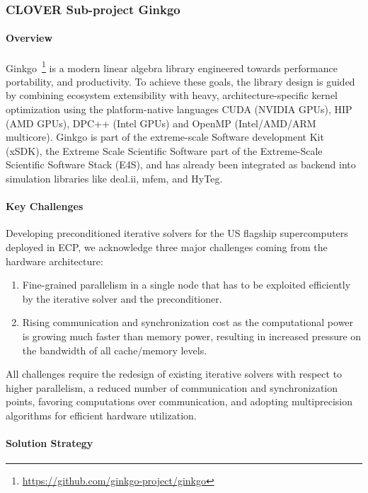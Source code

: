 \subsubsection{ CLOVER Sub-project Ginkgo} \label{subsubsect:peeks}
\paragraph{Overview} 
Ginkgo~\footnote{\url{https://github.com/ginkgo-project/ginkgo}} 
is a modern linear algebra library engineered towards performance portability, and productivity. 
To achieve these goals, the library design is guided by combining ecosystem extensibility with heavy, 
architecture-specific kernel optimization using the platform-native languages CUDA (NVIDIA GPUs), 
HIP (AMD GPUs), DPC++ (Intel GPUs) and OpenMP (Intel/AMD/ARM multicore). 
Ginkgo is part of the extreme-scale Software development Kit (xSDK), 
the Extreme Scale Scientific Software part of the Extreme-Scale Scientific Software Stack (E4S), 
and has already been integrated as backend into simulation libraries like deal.ii, mfem, and HyTeg. 



\paragraph{Key  Challenges}
Developing preconditioned iterative solvers for the US flagship supercomputers 
deployed in ECP, we acknowledge three major challenges coming from the hardware 
architecture:
\begin{enumerate}
\item 
Fine-grained parallelism in a single node that has to be exploited efficiently 
by the iterative solver and the preconditioner.
\item
Rising communication and synchronization cost as the
computational power is growing much faster than memory power, resulting in 
increased pressure on the bandwidth of all cache/memory levels.
\end{enumerate}

All challenges require the redesign of existing iterative solvers with respect 
to higher parallelism, %
a reduced number of 
communication and synchronization points, favoring computations over 
communication, and adopting multiprecision algorithms for efficient hardware 
utilization. 

\paragraph{Solution Strategy}

